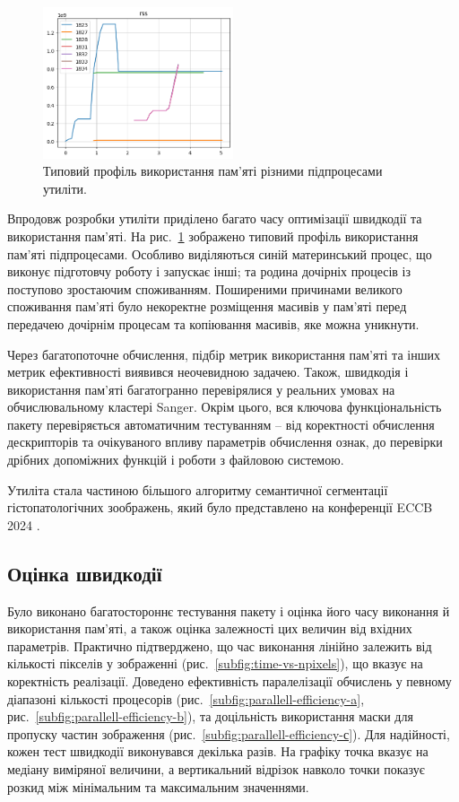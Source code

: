 \begin{figure}[h]
    \centering
    \includegraphics[width=0.5\textwidth]{img/fastlbp/memtest-1-rss.png}
    \caption{
        Типовий профіль використання пам'яті різними підпроцесами утиліти.
    }
    \label{fig:memprofile}
\end{figure}

Впродовж розробки утиліти приділено багато часу оптимізації швидкодії та використання пам'яті. 
На рис.~\ref{fig:memprofile} зображено типовий профіль використання пам'яті підпроцесами.
Особливо виділяються синій материнський процес, що виконує підготовчу роботу і запускає інші; 
та родина дочірніх процесів із поступово зростаючим споживанням.
Поширеними причинами великого споживання пам'яті було некоректне розміщення масивів у пам'яті перед передачею дочірнім процесам 
та копіювання масивів, яке можна уникнути. 

Через багатопоточне обчислення, підбір метрик використання пам'яті та інших метрик ефективності виявився неочевидною задачею.
Також, швидкодія і використання пам'яті багатогранно перевірялися у реальних умовах на обчислювальному кластері Sanger.
Окрім цього, вся ключова функціональність пакету перевіряється автоматичним тестуванням -- від коректності обчислення дескрипторів та очікуваного впливу параметрів обчислення ознак, 
до перевірки дрібних допоміжних функцій і роботи з файловою системою. 

Утиліта стала частиною більшого алгоритму семантичної сегментації гістопатологічних зоображень, 
який було представлено на конференції ECCB 2024 \cite{fastlbp2024}.

\subsection{Оцінка швидкодії}\label{section2.2d}\hfill

Було виконано багатостороннє тестування пакету і оцінка його часу виконання й використання пам'яті, 
а також оцінка залежності цих величин від вхідних параметрів.
Практично підтверджено, що час виконання лінійно залежить від кількості пікселів у зображенні (рис.~\ref{subfig:time-vs-npixels}), 
що вказує на коректність реалізації. Доведено ефективність паралелізації обчислень у певному діапазоні кількості процесорів (рис.~\ref{subfig:parallell-efficiency-a}, рис.~\ref{subfig:parallell-efficiency-b}),
та доцільність використання маски для пропуску частин зображення (рис.~\ref{subfig:parallell-efficiency-с}).
Для надійності, кожен тест швидкодії виконувався декілька разів. На графіку точка вказує на медіану виміряної величини, 
а вертикальний відрізок навколо точки показує розкид між мінімальним та максимальним значеннями.


